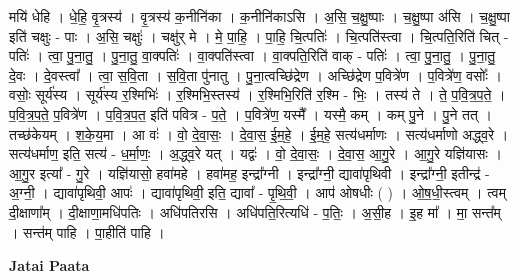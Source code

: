 \documentclass[17pt]{extarticle}
\begin{document}
मयि॑ धेहि । धे॒हि॒ वृ॒त्रस्य॑ । वृ॒त्रस्य॑ क॒नीनि॑का । क॒नीनि॑काऽसि । अ॒सि॒ च॒क्षु॒ष्पाः । च॒क्षु॒ष्पा अ॑सि । च॒क्षु॒ष्पा इति॑ चक्षुः - पाः । अ॒सि॒ चक्षुः॑ । चक्षु॑र् मे । मे॒ पा॒हि॒ । पा॒हि॒ चि॒त्पतिः॑ । चि॒त्पति॑स्त्वा । चि॒त्पति॒रिति॑ चित् - पतिः॑ । त्वा॒ पु॒ना॒तु॒ । पु॒ना॒तु॒ वा॒क्पतिः॑ । वा॒क्पति॑स्त्वा । वा॒क्पति॒रिति॑ वाक् - पतिः॑ । त्वा॒ पु॒ना॒तु॒ । पु॒ना॒तु॒ दे॒वः । दे॒वस्त्वा᳚ । त्वा॒ स॒वि॒ता । स॒वि॒ता पु॑नातु । पु॒ना॒त्वच्छि॑द्रेण । अच्छि॑द्रेण प॒वित्रे॑ण । प॒वित्रे॑ण॒ वसोः᳚ । वसोः॒ सूर्य॑स्य । सूर्य॑स्य र॒श्मिभिः॑ । र॒श्मिभि॒स्तस्य॑ । र॒श्मिभि॒रिति॑ र॒श्मि - भिः॒ । तस्य॑ ते । ते॒ प॒वि॒त्र॒प॒ते॒ । प॒वि॒त्र॒प॒ते॒ प॒वित्रे॑ण । प॒वि॒त्र॒प॒त॒ इति॑ पवित्र - प॒ते॒ । प॒वित्रे॑ण॒ यस्मै᳚ । यस्मै॒ कम् । कम् पु॒ने । पु॒ने तत् । तच्छ॑केयम् । श॒के॒य॒मा । आ वः॑ । वो॒ दे॒वा॒सः॒ । दे॒वा॒स॒ ई॒म॒हे॒ । ई॒म॒हे॒ सत्य॑धर्माणः । सत्य॑धर्माणो अद्ध्व॒रे । सत्य॑धर्माण॒ इति॒ सत्य॑ - ध॒र्मा॒णः॒ । अ॒द्ध्व॒रे यत् । यद्वः॑ । वो॒ दे॒वा॒सः॒ । दे॒वा॒स॒ आ॒गु॒रे । आ॒गु॒रे यज्ञि॑यासः । आ॒गु॒र इत्या᳚ - गु॒रे । यज्ञि॑यासो॒ हवा॑महे । हवा॑मह॒ इन्द्रा᳚ग्नी । इन्द्रा᳚ग्नी॒ द्यावा॑पृथिवी । इन्द्रा᳚ग्नी॒ इतीन्द्र॑ - अ॒ग्नी॒ । द्यावा॑पृथिवी॒ आपः॑ । द्यावा॑पृथिवी॒ इति॒ द्यावा᳚ - पृ॒थि॒वी॒ । 
आप॑ ओषधीः ( ) । ओ॒ष॒धी॒स्त्वम् । त्वम् दी॒क्षाणा᳚म् । दी॒क्षाणा॒मधि॑पतिः । अधि॑पतिरसि । अधि॑पति॒रित्यधि॑ - प॒तिः॒ । 
अ॒सी॒ह । इ॒ह मा᳚ । मा॒ सन्त᳚म् । सन्त॑म् पाहि । पा॒हीति॑ पाहि । \newline

\textbf{Jatai Paata} \newline
\end{document}
